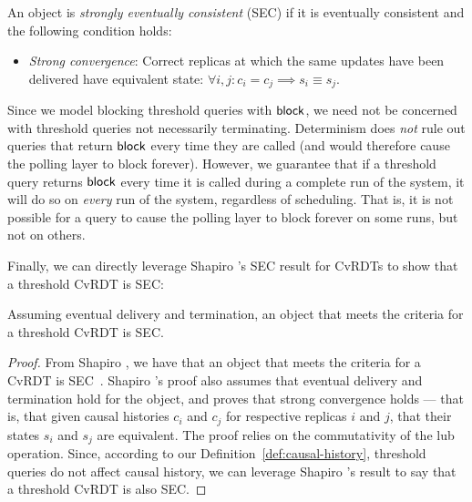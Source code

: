 \begin{definition}
  \label{def:strong-eventual-consistency}
  An object is \emph{strongly eventually consistent} (SEC) if it is
  eventually consistent and the following condition holds:
  \begin{itemize}
  \item \emph{Strong convergence}: Correct replicas at which the same
    updates have been delivered have equivalent state:
    $\forall i, j : c_i = c_j \implies s_i \equiv s_j$.
  \end{itemize}
\end{definition}
Since we model blocking threshold queries with $\textsf{block}$, we need not
be concerned with threshold queries not necessarily terminating.
Determinism does \emph{not} rule out queries that return $\textsf{block}$
every time they are called (and would therefore cause the polling
layer to block forever).  However, we guarantee that if a threshold
query returns $\textsf{block}$ every time it is called during a complete run
of the system, it will do so on \emph{every} run of the system,
regardless of scheduling.  That is, it is not possible for a query to
cause the polling layer to block forever on some runs, but not on
others.

Finally, we can directly leverage Shapiro \etal's SEC result for
CvRDTs to show that a threshold CvRDT is SEC:
\begin{thm}
  \label{thm:strong-eventual-consistency-of-threshold-cvrdts}
  Assuming eventual delivery and termination, an object that meets
  the criteria for a threshold CvRDT is SEC.
\end{thm}
\begin{proof}
From Shapiro \etal, we have that an object that meets the criteria for
a CvRDT is SEC~\cite{crdts}.  Shapiro \etal's proof also assumes that
eventual delivery and termination hold for the object, and proves that
strong convergence holds --- that is, that given causal histories
$c_i$ and $c_j$ for respective replicas $i$ and $j$, that their states
$s_i$ and $s_j$ are equivalent.  The proof relies on the commutativity
of the lub operation.  Since, according to our
Definition~\ref{def:causal-history}, threshold queries do not affect
causal history, we can leverage Shapiro \etal's result to say that a
threshold CvRDT is also SEC.
\end{proof}
